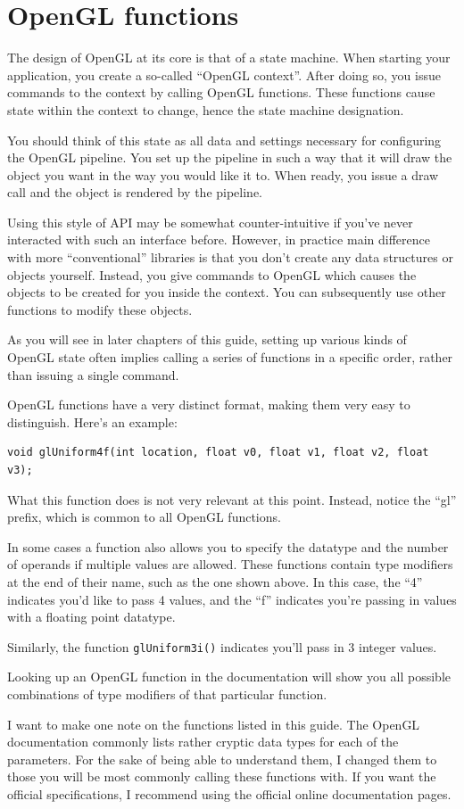 \section{OpenGL functions}

The design of OpenGL at its core is that of a state machine. When starting your application, you create a so-called ``OpenGL context''. After doing so, you issue commands to the context by calling OpenGL functions. These functions cause state within the context to change, hence the state machine designation. 

You should think of this state as all data and settings necessary for configuring the OpenGL pipeline. You set up the pipeline in such a way that it will draw the object you want in the way you would like it to. When ready, you issue a draw call and the object is rendered by the pipeline.

Using this style of API may be somewhat counter-intuitive if you've never interacted with such an interface before. However, in practice main difference with more ``conventional'' libraries is that you don't create any data structures or objects yourself. Instead, you give commands to OpenGL which causes the objects to be created for you inside the context. You can subsequently use other functions to modify these objects.

As you will see in later chapters of this guide, setting up various kinds of OpenGL state often implies calling a series of functions in a specific order, rather than issuing a single command. 

OpenGL functions have a very distinct format, making them very easy to distinguish. Here's an example:

\begin{verbatim}
void glUniform4f(int location, float v0, float v1, float v2, float v3);
\end{verbatim}

What this function does is not very relevant at this point. Instead, notice the ``gl'' prefix, which is common to all OpenGL functions. 

In some cases a function also allows you to specify the datatype and the number of operands if multiple values are allowed. These functions contain type modifiers at the end of their name, such as the one shown above. In this case, the ``4'' indicates you'd like to pass 4 values, and the ``f'' indicates you're passing in values with a floating point datatype. 

Similarly, the function \texttt{glUniform3i()} indicates you'll pass in 3 integer values.

Looking up an OpenGL function in the documentation will show you all possible combinations of type modifiers of that particular function.

I want to make one note on the functions listed in this guide. The OpenGL documentation commonly lists rather cryptic data types for each of the parameters. For the sake of being able to understand them, I changed them to those you will be most commonly calling these functions with. If you want the official specifications, I recommend using the official online documentation pages.